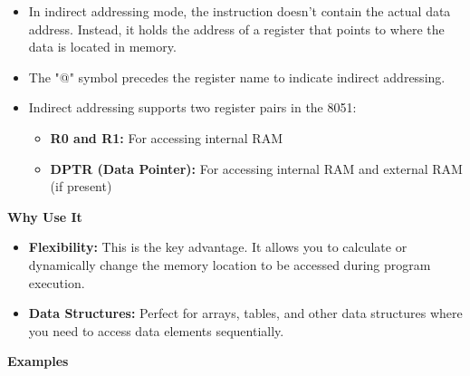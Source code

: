 \documentclass[
]{article}
\begin{document}
\begin{itemize}
\item
  In indirect addressing mode, the instruction doesn't contain the
  actual data address. Instead, it holds the address of a register that
  points to where the data is located in memory.
\item
  The "@" symbol precedes the register name to indicate indirect
  addressing.
\item
  Indirect addressing supports two register pairs in the 8051:

  \begin{itemize}
  \item
    \textbf{R0 and R1:} For accessing internal RAM
  \item
    \textbf{DPTR (Data Pointer):} For accessing internal RAM and
    external RAM (if present)
  \end{itemize}
\end{itemize}

\textbf{Why Use It}

\begin{itemize}
\item
  \textbf{Flexibility:} This is the key advantage. It allows you to
  calculate or dynamically change the memory location to be accessed
  during program execution.
\item
  \textbf{Data Structures:} Perfect for arrays, tables, and other data
  structures where you need to access data elements sequentially.
\end{itemize}

\textbf{Examples}
\end{document}
